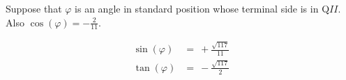 Suppose that $\varphi$ is an angle in standard position whose terminal side is in Q$II$. Also $\cos(\varphi) = -\frac{2}{11}$.

$$
\begin{align*}
  \sin(\varphi) &=\ +\frac{\sqrt{117}}{11} \\
  \tan(\varphi) &=\ -\frac{\sqrt{117}}{2} \\
\end{align*}
$$
